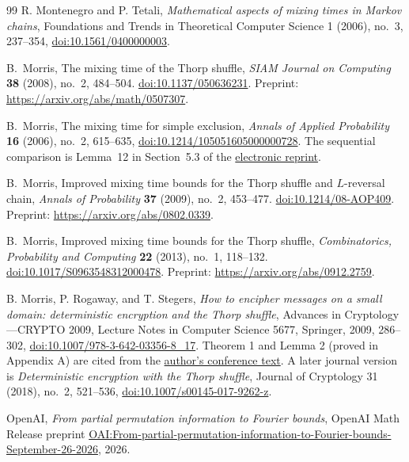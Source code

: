 \begin{thebibliography}{99}
R. Montenegro and P. Tetali,
\emph{Mathematical aspects of mixing times in Markov chains},
Foundations and Trends in Theoretical Computer Science 1 (2006), no.~3,
237--354, \href{https://doi.org/10.1561/0400000003}{doi:10.1561/0400000003}.

B.~Morris,
The mixing time of the Thorp shuffle,
\emph{SIAM Journal on Computing} \textbf{38} (2008), no.~2, 484--504.
\href{https://doi.org/10.1137/050636231}{doi:10.1137/050636231}.
Preprint: \url{https://arxiv.org/abs/math/0507307}.

B.~Morris,
The mixing time for simple exclusion,
\emph{Annals of Applied Probability} \textbf{16} (2006), no.~2, 615--635,
\href{https://doi.org/10.1214/105051605000000728}
{doi:10.1214/105051605000000728}.
The sequential comparison is Lemma~12 in Section~5.3 of the
\href{https://arxiv.org/abs/math/0405157v2}{electronic reprint}.

B.~Morris,
Improved mixing time bounds for the Thorp shuffle and $L$-reversal chain,
\emph{Annals of Probability} \textbf{37} (2009), no.~2, 453--477.
\href{https://doi.org/10.1214/08-AOP409}{doi:10.1214/08-AOP409}.
Preprint: \url{https://arxiv.org/abs/0802.0339}.

B.~Morris,
Improved mixing time bounds for the Thorp shuffle,
\emph{Combinatorics, Probability and Computing} \textbf{22} (2013),
no.~1, 118--132.
\href{https://doi.org/10.1017/S0963548312000478}
{doi:10.1017/S0963548312000478}.
Preprint: \url{https://arxiv.org/abs/0912.2759}.

B. Morris, P. Rogaway, and T. Stegers,
\emph{How to encipher messages on a small domain:
deterministic encryption and the Thorp shuffle},
Advances in Cryptology---CRYPTO 2009,
Lecture Notes in Computer Science 5677, Springer, 2009, 286--302,
\href{https://doi.org/10.1007/978-3-642-03356-8_17}{doi:10.1007/978-3-642-03356-8\_17}.
Theorem 1 and Lemma 2 (proved in Appendix A) are cited from the
\href{https://www.cs.ucdavis.edu/~rogaway/papers/thorp.pdf}{author's conference text}.
A later journal version is \emph{Deterministic encryption with the Thorp shuffle},
Journal of Cryptology 31 (2018), no.~2, 521--536,
\href{https://doi.org/10.1007/s00145-017-9262-z}{doi:10.1007/s00145-017-9262-z}.

OpenAI,
\emph{From partial permutation information to Fourier bounds},
OpenAI Math Release preprint
\href{https://github.com/openai/math/blob/main/preprints/From-partial-permutation-information-to-Fourier-bounds-September-26-2026/main.pdf}{OAI:From-partial-permutation-information-to-Fourier-bounds-September-26-2026},
2026.


\end{thebibliography}
